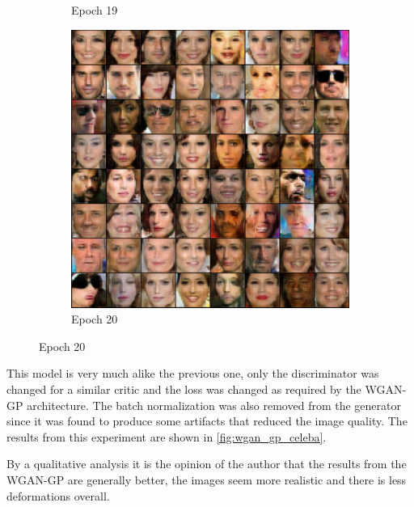 \begin{figure}[hbt]
\begin{subfigure}[b]{0.3\textwidth}
        \caption{Epoch 19}
        \end{subfigure}
    \hfill
        \begin{subfigure}[b]{0.3\textwidth}
        \centering
        \includegraphics[width=\textwidth]{chapters/Experiments/Other/wgan_gp_celeba20.png}
        \caption{Epoch 20}
        \end{subfigure}
    \label{fig:wgan_gp_celeba}
\end{figure}

This model is very much alike the previous one, only the discriminator was changed for a similar critic and the loss was changed as required by the \gls{WGAN-GP} architecture. The batch normalization was also removed from the generator since it was found to produce some artifacts that reduced the image quality. The results from this experiment are shown in \autoref{fig:wgan_gp_celeba}.

By a qualitative analysis it is the opinion of the author that the results from the \gls{WGAN-GP} are generally better, the images seem more realistic and there is less deformations overall.


